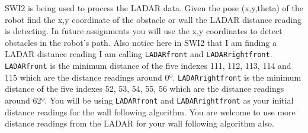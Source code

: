 \documentclass[11pt]{article}
\begin{document}
SWI2 is being used to process the LADAR data. Given the pose (x,y,theta) of the robot find the x,y coordinate of the obstacle or wall the LADAR distance reading is detecting. In future assignments you will use the x,y coordinates to detect obstacles in the robot’s path. Also notice here in SWI2 that I am finding a LADAR distance reading I am calling \texttt{LADARfront} and \texttt{LADARrightfront}. \texttt{LADARfront} is the minimum distance of the five indexes 111, 112, 113, 114 and 115 which are the distance readings around 0º. \texttt{LADARrightfront} is the minimum distance of the five indexes 52, 53, 54, 55, 56 which are the distance readings around 62º. You will be using \texttt{LADARfront} and \texttt{LADARrightfront} as your initial distance readings for the wall following algorithm. You are welcome to use more distance readings from the LADAR for your wall following algorithm also.

\end{document}
